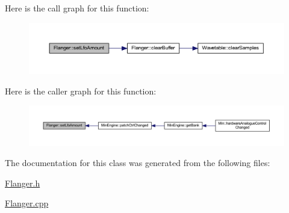 Here is the call graph for this function\+:
\nopagebreak
\begin{figure}[H]
\begin{center}
\leavevmode
\includegraphics[width=350pt]{d5/d64/class_flanger_a311ea2020c379266da75e57bec0cc5ad_cgraph}
\end{center}
\end{figure}
Here is the caller graph for this function\+:
\nopagebreak
\begin{figure}[H]
\begin{center}
\leavevmode
\includegraphics[width=350pt]{d5/d64/class_flanger_a311ea2020c379266da75e57bec0cc5ad_icgraph}
\end{center}
\end{figure}


The documentation for this class was generated from the following files\+:\begin{DoxyCompactItemize}
\item 
\hyperlink{_flanger_8h}{Flanger.\+h}\item 
\hyperlink{_flanger_8cpp}{Flanger.\+cpp}\end{DoxyCompactItemize}
